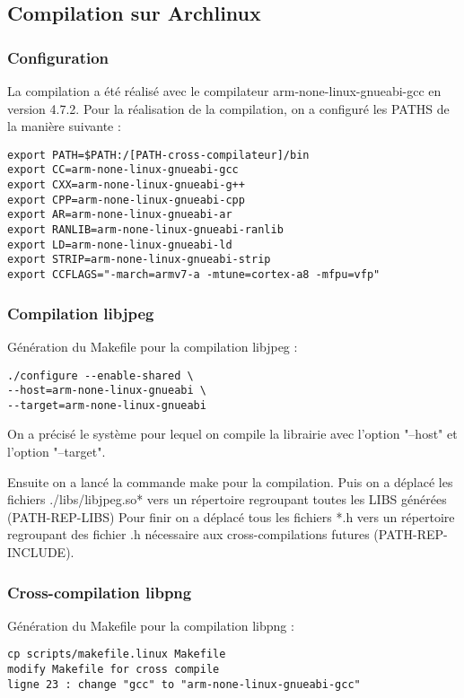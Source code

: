 \subsection{Compilation sur Archlinux}

\subsubsection{Configuration}
La compilation a été réalisé avec le compilateur arm-none-linux-gnueabi-gcc en version 4.7.2.
Pour la réalisation de la compilation, on a configuré les PATHS de la manière suivante : 

\begin{lstlisting}
export PATH=$PATH:/[PATH-cross-compilateur]/bin
export CC=arm-none-linux-gnueabi-gcc
export CXX=arm-none-linux-gnueabi-g++
export CPP=arm-none-linux-gnueabi-cpp
export AR=arm-none-linux-gnueabi-ar
export RANLIB=arm-none-linux-gnueabi-ranlib
export LD=arm-none-linux-gnueabi-ld
export STRIP=arm-none-linux-gnueabi-strip
export CCFLAGS="-march=armv7-a -mtune=cortex-a8 -mfpu=vfp"
\end{lstlisting}

\subsubsection{Compilation libjpeg}
Génération du Makefile pour la compilation libjpeg :

\begin{lstlisting}
./configure --enable-shared \
--host=arm-none-linux-gnueabi \
--target=arm-none-linux-gnueabi
\end{lstlisting}

On a précisé le système pour lequel on compile la librairie avec l'option "--host" et l'option "--target". 

Ensuite on a lancé la commande make pour la compilation.
Puis on a déplacé les fichiers ./libs/libjpeg.so* vers un répertoire regroupant toutes les LIBS générées (PATH-REP-LIBS)
Pour finir on a déplacé tous les fichiers *.h vers un répertoire regroupant des fichier .h nécessaire aux cross-compilations futures (PATH-REP-INCLUDE).

\subsubsection{Cross-compilation libpng}
Génération du Makefile pour la compilation libpng :

\begin{lstlisting}
cp scripts/makefile.linux Makefile
modify Makefile for cross compile
ligne 23 : change "gcc" to "arm-none-linux-gnueabi-gcc"
\end{lstlisting}

